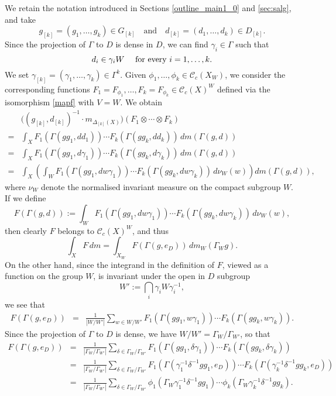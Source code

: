 \documentclass[11pt,reqno,a4paper]{amsart}
\numberwithin{equation}{section}
\newcommand{\cC}{\mathcal{C}}
\newcommand{\qand}{\quad \textrm{and} \quad}
\theoremstyle{theorem}
\theoremstyle{definition}
\begin{document}
We retain the notation introduced in Sections \ref{outline_main1_0} and \ref{sec:salg}, and take 
\begin{equation}
\label{eq:gd}
g_{[k]} = (g_1,\ldots,g_k) \in G_{[k]} \qand d_{[k]} = (d_1,\ldots,d_k) \in D_{[k]}.
\end{equation}
Since the projection of $\Gamma$ to $D$ is dense in $D$, 
we can find $\gamma_i \in \Gamma$ 
such that 
\begin{equation}
\label{eq:ggg}
d_i \in  \gamma_i W \quad\hbox{ for every $i = 1,\ldots,k$.}
\end{equation}
We set
$\gamma_{[k]} = (\gamma_1,\ldots,\gamma_k) \in \Gamma^k.$
Given ${\phi}_1,\ldots,{\phi}_k \in\cC_c(X_W)$, we consider the corresponding
functions $F_1 =F_{{\phi}_1},\ldots,F_k=F_{{\phi}_k} \in\cC_c(X)^W$
defined via the isomorphism \eqref{mapf} with $V=W$.
We obtain
\begin{align*}
&\big((g_{[k]},d_{[k]}) ^{-1}\cdot m_{\Delta_{[k]}(X)}\big)({F}_1 \otimes \cdots \otimes {F}_k) \\
= &
\int_X F_1(\Gamma(gg_1,dd_1)) \cdots F_k(\Gamma(gg_k,dd_k))
\,
dm(\Gamma(g,d)) \\
= &
\int_X F_1(\Gamma(gg_1,d\gamma_1)) \cdots F_k(\Gamma(gg_k,d\gamma_k))
\,
dm(\Gamma(g,d)) \\
=&
\int_X \left( \int_W F_1(\Gamma(gg_1,dw\gamma_1)) \cdots F_k(\Gamma(gg_k,dw \gamma_k)) \, d\nu_W(w) \right)
dm(\Gamma(g,d)),
\end{align*}
where $\nu_W$ denote the normalised invariant measure on the compact subgroup $W$.
If we define
\[
F(\Gamma(g,d)) := \int_W F_1(\Gamma(gg_1,dw\gamma_1)) \cdots F_k(\Gamma(gg_k,dw \gamma_k)) \, d\nu_W(w),
\]
then clearly $F$ belongs to $\cC_c(X)^W$, and thus
\[
\int_X F \, dm = \int_{X_W} F(\Gamma(g,e_D)) \, dm_W(\Gamma_W g).
\]
On the other hand, since the integrand in the definition of $F$, viewed as a function on the group $W$, is invariant under the open in $D$ subgroup 
$$
W' := \bigcap_{i} \gamma_iW\gamma_i^{-1},
$$
we see that
\begin{eqnarray*}
F(\Gamma(g,e_D)) &=& \frac{1}{|W/W'|} \sum_{w \in W/W'} 
F_1(\Gamma(gg_1,w\gamma_1)) \cdots F_k(\Gamma(gg_k,w \gamma_k)).
\end{eqnarray*}
Since the projection of $\Gamma$ to $D$ is dense, we have $W/W'=\Gamma_{W}/\Gamma_{W'}$, so that
\begin{eqnarray*}
	F(\Gamma(g,e_D)) &=& \frac{1}{|\Gamma_{W}/\Gamma_{W'}|} \sum_{\delta\in \Gamma_{W}/ \Gamma_{W'}} 
	F_1(\Gamma(gg_1,\delta\gamma_1)) \cdots F_k(\Gamma(gg_k,\delta \gamma_k)) 
	\\
	&=& \frac{1}{|\Gamma_{W}/\Gamma_{W'}|} \sum_{\delta\in \Gamma_{W}/ \Gamma_{W'}} 
	F_1(\Gamma(\gamma_1^{-1} \delta^{-1} gg_1,e_D)) \cdots F_k(\Gamma(\gamma_k^{-1} \delta^{-1} gg_k,e_D))
	\\
	&=&
	\frac{1}{|\Gamma_{W}/\Gamma_{W'}|} \sum_{\delta\in \Gamma_{W}/ \Gamma_{W'}} 
	\phi_1(\Gamma_W \gamma_1^{-1} \delta^{-1} gg_1) \cdots \phi_k(\Gamma_W \gamma_k^{-1} \delta^{-1} gg_k).
\end{eqnarray*}
\end{document}
